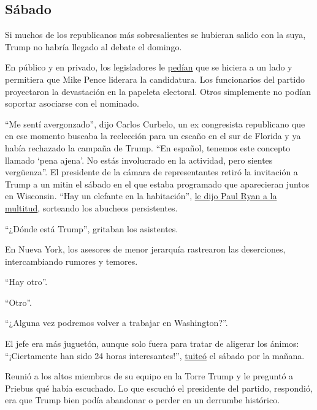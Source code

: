\hypertarget{suxe1bado}{%
\subsection{Sábado}\label{suxe1bado}}

Si muchos de los republicanos más sobresalientes se hubieran salido con
la suya, Trump no habría llegado al debate el domingo.

En público y en privado, los legisladores le
\href{https://www.pbs.org/newshour/politics/headline-republicans-react-trump-comments-objectifying-women}{pedían}
que se hiciera a un lado y permitiera que Mike Pence liderara la
candidatura. Los funcionarios del partido proyectaron la devastación en
la papeleta electoral. Otros simplemente no podían soportar asociarse
con el nominado.

``Me sentí avergonzado'', dijo Carlos Curbelo, un ex congresista
republicano que en ese momento buscaba la reelección para un escaño en
el sur de Florida y ya había rechazado la campaña de Trump. ``En
español, tenemos este concepto llamado `pena ajena'. No estás
involucrado en la actividad, pero sientes vergüenza''. El presidente de
la cámara de representantes retiró la invitación a Trump a un mitin el
sábado en el que estaba programado que aparecieran juntos en Wisconsin.
``Hay un elefante en la habitación'',
\href{https://madison.com/wsj/news/local/govt-and-politics/paul-ryan-heckled-on-home-turf-after-donald-trump-mike-pence-scratched-from-gop-event/article_8e0acf67-1f2f-56a4-b42d-e8ebcbd0bc67.html}{le
dijo Paul Ryan a la multitud}, sorteando los abucheos persistentes.

``¿Dónde está Trump'', gritaban los asistentes.

En Nueva York, los asesores de menor jerarquía rastrearon las
deserciones, intercambiando rumores y temores.

``Hay otro''.

``Otro''.

``¿Alguna vez podremos volver a trabajar en Washington?''.

El jefe era más juguetón, aunque solo fuera para tratar de aligerar los
ánimos: ``¡Ciertamente han sido 24 horas interesantes!'',
\href{https://twitter.com/realdonaldtrump/status/784767399442653184?lang=en}{tuiteó}
el sábado por la mañana.

Reunió a los altos miembros de su equipo en la Torre Trump y le preguntó
a Priebus qué había escuchado. Lo que escuchó el presidente del partido,
respondió, era que Trump bien podía abandonar o perder en un derrumbe
histórico.

